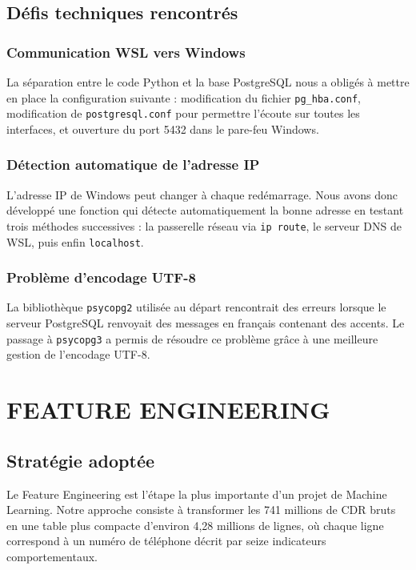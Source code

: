 \documentclass[12pt, oneside, a4paper]{report}
\begin{document}
\subsection{Défis techniques rencontrés}

\subsubsection{Communication WSL vers Windows}
La séparation entre le code Python et la base PostgreSQL nous a obligés à mettre en place la configuration suivante : modification du fichier \texttt{pg\_hba.conf}, modification de \texttt{postgresql.conf} pour permettre l'écoute sur toutes les interfaces, et ouverture du port 5432 dans le pare-feu Windows.

\subsubsection{Détection automatique de l'adresse IP}
L'adresse IP de Windows peut changer à chaque redémarrage. Nous avons donc développé une fonction qui détecte automatiquement la bonne adresse en testant trois méthodes successives : la passerelle réseau via \texttt{ip route}, le serveur DNS de WSL, puis enfin \texttt{localhost}.

\subsubsection{Problème d'encodage UTF-8}
La bibliothèque \texttt{psycopg2} utilisée au départ rencontrait des erreurs lorsque le serveur PostgreSQL renvoyait des messages en français contenant des accents. Le passage à \texttt{psycopg3} a permis de résoudre ce problème grâce à une meilleure gestion de l'encodage UTF-8.

\section{FEATURE ENGINEERING}

\subsection{Stratégie adoptée}
Le Feature Engineering est l'étape la plus importante d'un projet de Machine Learning. Notre approche consiste à transformer les 741 millions de CDR bruts en une table plus compacte d'environ 4,28 millions de lignes, où chaque ligne correspond à un numéro de téléphone décrit par seize indicateurs comportementaux.
\end{document}
